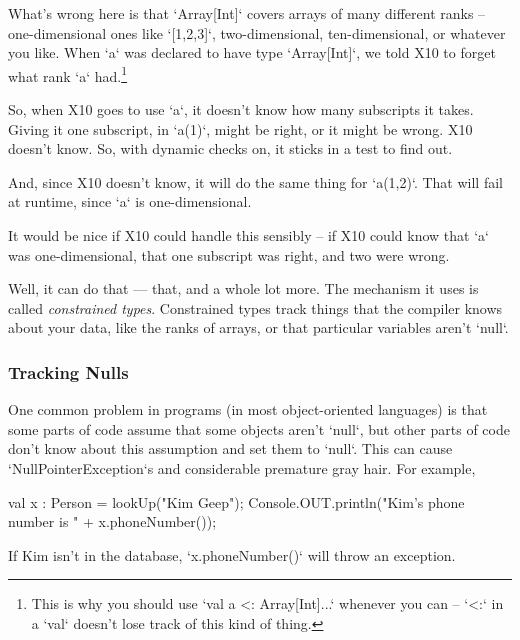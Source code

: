 What's wrong here is that \xcd`Array[Int]` covers arrays of many different
ranks -- one-dimensional ones like \xcd`[1,2,3]`, two-dimensional,
ten-dimensional, or whatever you like.  When \xcd`a` was declared to have
type \xcd`Array[Int]`, we told X10 to forget what rank \xcd`a`
had.\footnote{This is why you should use \xcd`val a <: Array[Int]...` 
whenever you can -- \xcd`<:` in a \xcd`val` doesn't lose track of this kind of
thing.}

So, when X10 goes to use \xcd`a`, it doesn't know how many subscripts it
takes.   Giving it one subscript, in \xcd`a(1)`, might be right, or it might
be wrong. X10 doesn't know.  So, with dynamic checks on, it sticks in a test
to find out.  

And, since X10 doesn't know, it will do the same thing for \xcd`a(1,2)`.
That will fail at runtime, since \xcd`a` is one-dimensional.  

It would be nice if X10 could handle this sensibly -- if X10 could know that
\xcd`a` was one-dimensional, that one subscript was right, and two were wrong.  

Well, it can do that --- that, and a whole lot more.  The mechanism it uses is
called {\em constrained types}.  Constrained types track things that the
compiler knows about your data, like the ranks of arrays, or that particular
variables aren't \xcd`null`.  


\subsubsection{Tracking Nulls}




One common problem in programs (in most object-oriented languages) is that
some parts of code assume that some objects aren't \xcd`null`, but other parts
of code don't know about this assumption and set them to \xcd`null`.  This can
cause \xcd`NullPointerException`s and considerable premature gray hair.  
For example, 

\begin{xtennum}[]
val x : Person = lookUp("Kim Geep");
Console.OUT.println("Kim's phone number is " + x.phoneNumber());
\end{xtennum}

If Kim isn't in the database, \xcd`x.phoneNumber()` will throw an exception.  

